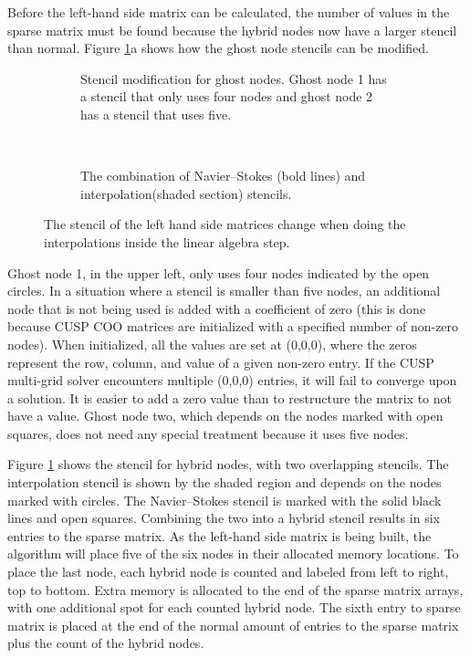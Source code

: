 \documentclass[preprint,12pt]{elsarticle}
\begin{document}
Before the left-hand side matrix can be calculated, the number of values in the sparse matrix must be found because the hybrid nodes now have a larger stencil than normal. 
Figure \ref{fig:ID combined stencil}a shows how the ghost node stencils can be modified. 
\begin{figure}[!htb]
	\centering
	\begin{subfigure}{0.4\textwidth}
		
		\caption{Stencil modification for ghost nodes. Ghost node 1 has a stencil that only uses four nodes and ghost node 2 has a stencil that uses five.}		
	\end{subfigure}
	~
	\begin{subfigure}{0.4\textwidth}
		
		\caption{The combination of Navier--Stokes (bold lines) and interpolation(shaded section) stencils.}		
	\end{subfigure}
	\caption{The stencil of the left hand side matrices change when doing the interpolations inside the linear algebra step.}
	\label{fig:ID combined stencil}
\end{figure}
Ghost node 1, in the upper left, only uses four nodes indicated by the open circles. 
In a situation where a stencil is smaller than five nodes, an additional node that is not being used is added with a coefficient of zero (this is done because CUSP COO matrices are initialized with a specified number of non-zero nodes).
When initialized, all the values are set at (0,0,0), where the zeros represent the row, column, and value of a given non-zero entry.
If the CUSP multi-grid solver encounters multiple (0,0,0) entries, it will fail to converge upon a solution.
It is easier to add a zero value than to restructure the matrix to not have a value.
Ghost node two, which depends on the nodes marked with open squares, does not need any special treatment because it uses five nodes. 

Figure \ref{fig:ID combined stencil} shows the stencil for hybrid nodes, with two overlapping stencils. 
The interpolation stencil is shown by the shaded region and depends on the nodes marked with circles. 
The Navier--Stokes stencil is marked with the solid black lines and open squares.
Combining the two into a hybrid stencil results in six entries to the sparse matrix. 
As the left-hand side matrix is being built, the algorithm will place five of the six nodes in their allocated memory locations. 
To place the last node, each hybrid node is counted and labeled from left to right, top to bottom. 
Extra memory is allocated to the end of the sparse matrix arrays, with one additional spot for each counted hybrid node. 
The sixth entry to sparse matrix is placed at the end of the normal amount of entries to the sparse matrix plus the count of the hybrid nodes. 
\end{document}
